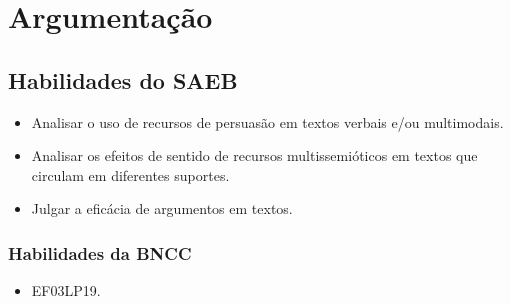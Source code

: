 \chapter{Argumentação}


\section{Habilidades do SAEB}

\begin{itemize}
  \item Analisar o uso de recursos de persuasão em textos verbais e/ou
multimodais.
  \item Analisar os efeitos de sentido de recursos multissemióticos em
textos que circulam em diferentes suportes.
  \item Julgar a eficácia de argumentos em textos.
\end{itemize}

\subsection{Habilidades da BNCC}

\begin{itemize}
  \item EF03LP19.
\end{itemize}

